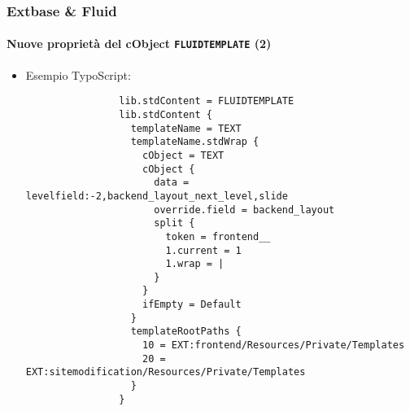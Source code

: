 \begin{frame}[fragile]
	\frametitle{Extbase \& Fluid}
	\framesubtitle{Nuove proprietà del cObject \texttt{FLUIDTEMPLATE} (2)}

	\lstset{basicstyle=\tiny\ttfamily}

	\begin{itemize}

		\item Esempio TypoScript:

			\begin{lstlisting}
				lib.stdContent = FLUIDTEMPLATE
				lib.stdContent {
				  templateName = TEXT
				  templateName.stdWrap {
				    cObject = TEXT
				    cObject {
				      data = levelfield:-2,backend_layout_next_level,slide
				      override.field = backend_layout
				      split {
				        token = frontend__
				        1.current = 1
				        1.wrap = |
				      }
				    }
				    ifEmpty = Default
				  }
				  templateRootPaths {
				    10 = EXT:frontend/Resources/Private/Templates
				    20 = EXT:sitemodification/Resources/Private/Templates
				  }
				}
			\end{lstlisting}

	\end{itemize}

\end{frame}


